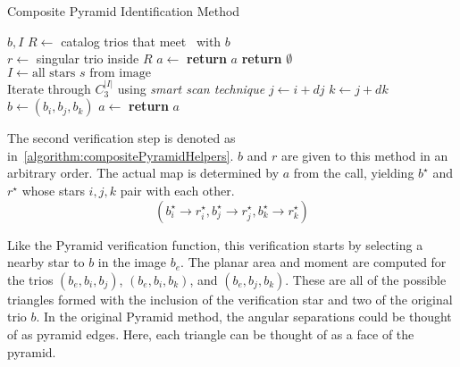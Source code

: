 \begin{algorithm}
    \caption{Composite Pyramid Identification Method} \label{algorithm:compositePyramidIdentification}
    \begin{algorithmic}[1]
         {$b, I$}
        \State $R \gets $ catalog trios that meet~ with $b$
        \\
        \State $r \gets $ singular trio inside $R$
        \State $a \gets $ 
        \State \textbf{return} $a$
        \EndIf
        \EndIf
        \State \textbf{return } $\emptyset$
        \EndFunction
        \\
        \State $I \gets \text{all stars } s \text{ from image}$
        \\
        \LineComment Iterate through $C^{|I|}_3$ using \textit{smart scan technique}
        \State $j \gets i + dj$
        \State $k \gets j + dk$
        \\
        \State $b \gets (b_i, b_j, b_k)$
        \State $a \gets$ 
        \State \textbf{return} $a$
        \EndIf
        \EndFor
        \EndFor
        \EndFor
        \EndProcedure
    \end{algorithmic}
\end{algorithm}

The second verification step is denoted as 
in~\autoref{algorithm:compositePyramidHelpers}.
$b$ and $r$ are given to this method in an arbitrary order.
The actual map is determined by $a$ from the  call, yielding $b^{\star}$ and $r^{\star}$ whose stars $i, j,
k$ pair with each other.
\begin{equation}
    (b^\star_i \rightarrow r^\star_i, b^\star_j \rightarrow r^\star_j, b^\star_k \rightarrow r^\star_k )
\end{equation}

Like the Pyramid verification function, this verification starts by selecting a nearby star to $b$ in the image $b_e$.
The planar area and moment are computed for the trios $(b_e, b_i, b_j)$, $(b_e, b_i, b_k)$, and $(b_e, b_j, b_k)$.
These are all of the possible triangles formed with the inclusion of the verification star and two of the original
trio $b$.
In the original Pyramid method, the angular separations could be thought of as pyramid edges.
Here, each triangle can be thought of as a face of the pyramid.

